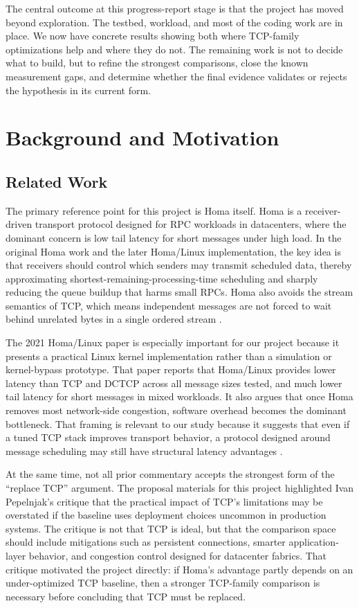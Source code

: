 \documentclass[11pt]{article}
\begin{document}
The central outcome at this progress-report stage is that the project has moved beyond exploration. The testbed, workload, and most of the coding work are in place. We now have concrete results showing both where TCP-family optimizations help and where they do not. The remaining work is not to decide what to build, but to refine the strongest comparisons, close the known measurement gaps, and determine whether the final evidence validates or rejects the hypothesis in its current form.

\section{Background and Motivation}

\subsection{Related Work}

The primary reference point for this project is Homa itself. Homa is a receiver-driven transport protocol designed for RPC workloads in datacenters, where the dominant concern is low tail latency for short messages under high load. In the original Homa work and the later Homa/Linux implementation, the key idea is that receivers should control which senders may transmit scheduled data, thereby approximating shortest-remaining-processing-time scheduling and sharply reducing the queue buildup that harms small RPCs. Homa also avoids the stream semantics of TCP, which means independent messages are not forced to wait behind unrelated bytes in a single ordered stream \cite{homa-linux}.

The 2021 Homa/Linux paper is especially important for our project because it presents a practical Linux kernel implementation rather than a simulation or kernel-bypass prototype. That paper reports that Homa/Linux provides lower latency than TCP and DCTCP across all message sizes tested, and much lower tail latency for short messages in mixed workloads. It also argues that once Homa removes most network-side congestion, software overhead becomes the dominant bottleneck. That framing is relevant to our study because it suggests that even if a tuned TCP stack improves transport behavior, a protocol designed around message scheduling may still have structural latency advantages \cite{homa-linux}.

At the same time, not all prior commentary accepts the strongest form of the ``replace TCP'' argument. The proposal materials for this project highlighted Ivan Pepelnjak's critique that the practical impact of TCP's limitations may be overstated if the baseline uses deployment choices uncommon in production systems. The critique is not that TCP is ideal, but that the comparison space should include mitigations such as persistent connections, smarter application-layer behavior, and congestion control designed for datacenter fabrics. That critique motivated the project directly: if Homa's advantage partly depends on an under-optimized TCP baseline, then a stronger TCP-family comparison is necessary before concluding that TCP must be replaced.
\end{document}
